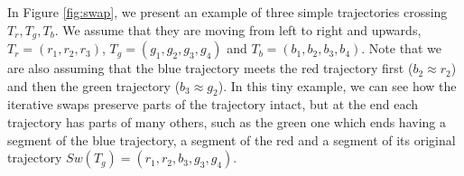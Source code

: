 \documentclass{llncs}
\begin{document}
\begin{figure}[!t]
\end{figure}


In Figure \ref{fig:swap}, we present an example of three simple trajectories crossing $T_r, T_g, T_b$. We assume that they are moving from left to right and upwards, $T_r = (r_1, r_2, r_3)$, $T_g = (g_1, g_2, g_3, g_4)$ and $T_b = (b_1, b_2, b_3, b_4)$. Note that we are also assuming that the blue trajectory meets the red trajectory first ($b_2 \approx r_2$) and then the green trajectory ($b_3 \approx g_2$). In this tiny example, we can see how the iterative swaps preserve parts of the trajectory intact, but at the end each trajectory has parts of many others, such as the green one which ends having a segment of the blue trajectory, a segment of the red and a segment of its original trajectory $Sw(T_g)=(r_1, r_2, b_3, g_3, g_4)$.
\end{document}
